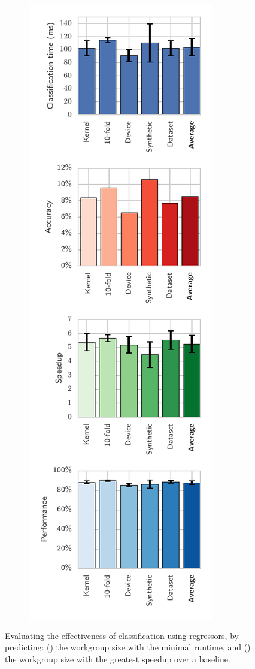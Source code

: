 \documentclass[nonatbib,preprint,10pt]{sigplanconf}
\begin{document}
\begin{figure}
\begin{subfigure}[h]{.48\columnwidth}
\caption{}
\label{fig:runtime-class-xval}
\end{subfigure}
\begin{subfigure}[h]{.48\columnwidth}
\centering
\includegraphics[width=\columnwidth]{img/speedup-class-xval}
\caption{}
\label{fig:speedup-class-xval}
\end{subfigure}
\caption[Autotuning performance using regressors]{%
  Evaluating the effectiveness of classification using regressors, by
  predicting: () the workgroup size
  with the minimal runtime, and () the
  workgroup size with the greatest speedup over a baseline.%
}
\label{fig:regression-class}
\end{figure}
\end{document}
